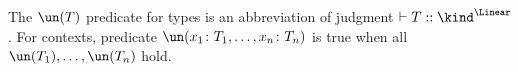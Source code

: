 
%

% 


% 

% 


% 



The $\un(T)$ predicate for types is an abbreviation of judgment
$\vdash T :: \kind^\Linear$. For contexts, predicate
$\un(x_1\colon T_1,\dots, x_n\colon T_n)$ is true when all
$\un(T_1),\dots,\un(T_n)$ hold.


